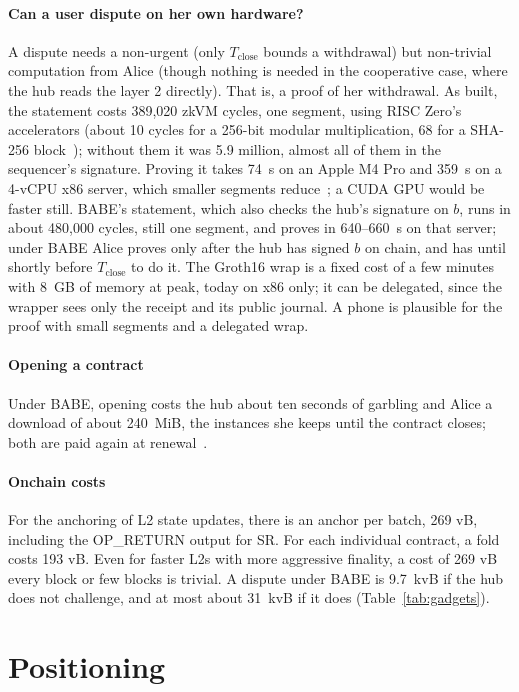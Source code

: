 \documentclass[11pt]{article}
\newcommand{\Tc}{T_{\mathrm{close}}}
\begin{document}
\paragraph{Can a user dispute on her own hardware?} A dispute needs
a non-urgent (only $\Tc$ bounds
a withdrawal) but non-trivial computation from Alice (though nothing is needed in the cooperative case, where the hub
reads the layer 2 directly). That is, a proof of her withdrawal. As built,
the statement costs 389,020 zkVM cycles, one segment, using RISC Zero's
accelerators (about 10 cycles for a 256-bit modular multiplication, 68
for a SHA-256 block~\cite{risc0accel}); without them it was 5.9
million, almost all of them in the sequencer's signature. Proving it
takes 74~s on an Apple M4 Pro and 359~s on a
4-vCPU x86 server, which smaller
segments reduce~\cite{risc0data}; a CUDA GPU would be faster still.
BABE's statement, which also checks the hub's signature on $b$, runs in
about 480,000 cycles, still one segment, and proves in 640--660~s on that
server; under BABE Alice proves only after the hub has signed $b$ on
chain, and has until shortly before $\Tc$ to do it. The Groth16 wrap is a fixed cost of a few minutes with 8~GB of memory at peak, today on x86
only; it can be delegated, since the wrapper sees only the receipt and
its public journal. A phone is plausible for the proof with small segments and a delegated wrap.

\paragraph{Opening a contract} Under BABE, opening costs the hub about ten seconds of garbling and Alice a download of about 240~MiB, the instances she keeps until the contract closes; both are paid again at renewal~\cite[\S 8]{lichenbabe}.

\paragraph{Onchain costs} For the anchoring of L2 state updates, there is an anchor per batch, 269 vB, including the OP\_RETURN output for SR. For each individual contract, a fold costs 193 vB. Even for faster L2s with more aggressive finality, a cost of 269 vB every block or few blocks is trivial. A dispute under BABE is 9.7~kvB if the hub does not challenge, and at most about 31~kvB if it does (Table~\ref{tab:gadgets}).

\section{Positioning}
\label{sec:positioning}
\end{document}
